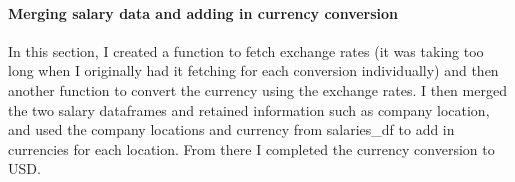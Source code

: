 \documentclass[11pt]{article}
\begin{document}
    \hypertarget{merging-salary-data-and-adding-in-currency-conversion}{%
\paragraph{Merging salary data and adding in currency
conversion}\label{merging-salary-data-and-adding-in-currency-conversion}}

    In this section, I created a function to fetch exchange rates (it was
taking too long when I originally had it fetching for each conversion
individually) and then another function to convert the currency using
the exchange rates. I then merged the two salary dataframes and retained
information such as company location, and used the company locations and
currency from salaries\_df to add in currencies for each location. From
there I completed the currency conversion to USD.
\end{document}
